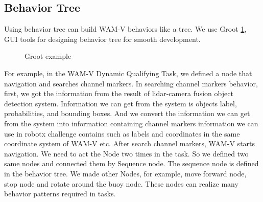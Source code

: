 \documentclass[lettersize,journal]{IEEEtran}
\begin{document}
\subsection{Behavior Tree}
Using behavior tree can build WAM-V behaviors like a tree.  
We use Groot \ref{fig:Groot}, GUI tools for designing behavior tree for smooth development.

\begin{figure}[htbp]
  \begin{center}
  \end{center}
  \caption{Groot example}
  \label{fig:Groot}
\end{figure}

For example, in the WAM-V Dynamic Qualifying Task, 
we defined a node that navigation and searches channel markers.
In searching channel markers behavior, first, we got the information from the result of lidar-camera fusion object detection system. 
Information we can get from the system is objects label, probabilities, and bounding boxes.
And we convert the information we can get from the system into information containing channel markers information 
we can use in robotx challenge contains such as labels and coordinates in the same coordinate system of WAM-V etc.
After search channel markers, WAM-V starts navigation.
We need to act the Node two times in the task. So we defined two same nodes and connected them by Sequence node. 
The sequence node is defined in the behavior tree.
We made other Nodes, for example, move forward node, stop node and rotate around the buoy node.
These nodes can realize many behavior patterns required in tasks.
\end{document}
